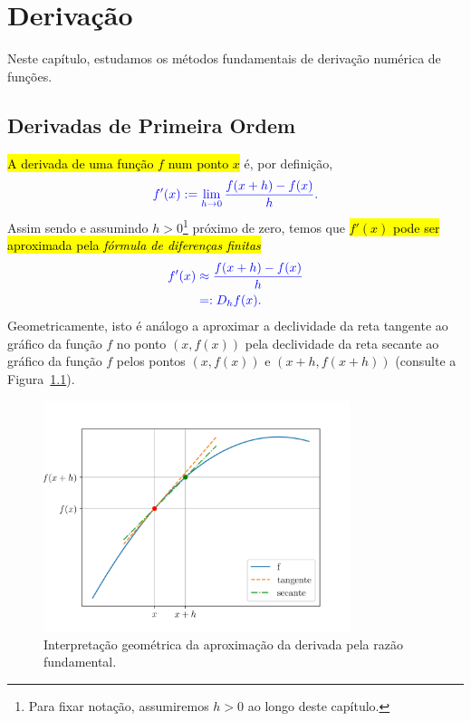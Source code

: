 
\chapter{Derivação}\label{cap_deriv}

Neste capítulo, estudamos os métodos fundamentais de derivação numérica de funções.

\section{Derivadas de Primeira Ordem}\label{cap_deriv_sec_df}

\hl{A derivada de uma função $f$ num ponto $x$} é, por definição,
\begin{equation}\color{blue}f'(x) := \lim_{h\to 0} \frac{f(x+h) - f(x)}{h}.
\end{equation}
Assim sendo e assumindo $h>0$\footnote{Para fixar notação, assumiremos $h>0$ ao longo deste capítulo.} próximo de zero, temos que \hl{$f'(x)$ pode ser aproximada pela \emph{fórmula de diferenças finitas}}
\begin{subequations}\label{cap_deriv_sec_df:eq:fdf}\hleq
  \begin{align}
    f'(x) &\approx \frac{f(x+h) - f(x)}{h}\\
          &=: D_hf(x).
  \end{align}
\end{subequations}
Geometricamente, isto é análogo a aproximar a declividade da reta tangente ao gráfico da função $f$ no ponto $(x, f(x))$ pela declividade da reta secante ao gráfico da função $f$ pelos pontos $(x, f(x))$ e $(x+h, f(x+h))$ (consulte a Figura~\ref{cap_deriv_sec_df:fig:intro_deriv}).

\begin{figure}[H]
  \centering
  \includegraphics[width=0.8\textwidth]{cap_deriv/dados/fig_intro_deriv/fig}
  \caption{Interpretação geométrica da aproximação da derivada pela razão fundamental.}
  \label{cap_deriv_sec_df:fig:intro_deriv}
\end{figure}

